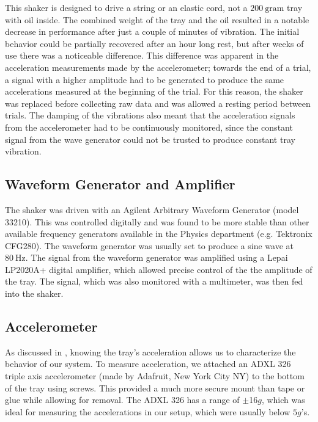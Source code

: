     This shaker is designed to drive a string or an elastic cord, not a $200~\mathrm{gram}$ tray with oil inside. The combined weight of the tray and the oil resulted in a notable decrease in performance after just a couple of minutes of vibration. The initial behavior could be partially recovered after an hour long rest, but after weeks of use there was a noticeable difference. This difference was apparent in the acceleration measurements made by the accelerometer; towards the end of a trial, a signal with a higher amplitude had to be generated to produce the same accelerations measured at the beginning of the trial. For this reason, the shaker was replaced before collecting raw data and was allowed a resting period between trials. The damping of the vibrations also meant that the acceleration signals from the accelerometer had to be continuously  monitored, since the constant signal from the wave generator could not be trusted to produce constant tray vibration. 
    
\subsection{Waveform Generator and Amplifier}
    The shaker was driven with an Agilent Arbitrary Waveform Generator (model 33210). This was controlled digitally and was found to be more stable than other available frequency generators available in the Physics department (e.g. Tektronix CFG280). The waveform generator was usually set to produce a sine wave at $80~\mathrm{Hz}$. The signal from the waveform generator was amplified using a Lepai LP2020A+ digital amplifier, which allowed precise control of the the amplitude of the tray. The signal, which was also monitored with a multimeter, was then fed into the shaker.    
            
\subsection{Accelerometer}  
    As discussed in , knowing the tray's acceleration allows us to characterize the behavior of our system. To measure acceleration, we attached an ADXL 326 triple axis accelerometer (made by Adafruit, New York City NY) to the bottom of the tray using screws. This provided a much more secure mount than tape or glue while allowing for removal. The ADXL 326 has a range of $\pm$16$g$, which was ideal for measuring the accelerations in our setup, which were usually below $5g$'s. 
      

